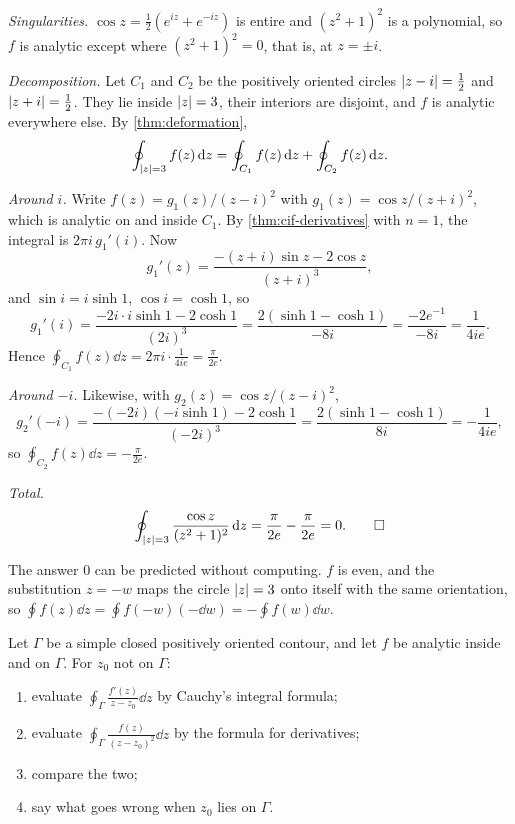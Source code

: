 \begin{solution}
  \emph{Singularities.} $\cos z = \frac12(e^{iz} + e^{-iz})$ is entire and
  $(z^2 + 1)^2$ is a polynomial, so $f$ is analytic except where
  $(z^2 + 1)^2 = 0$, that is, at $z = \pm i$.

  \emph{Decomposition.} Let $C_1$ and $C_2$ be the positively oriented
  circles $\lvert z - i\rvert = \frac12$ and $\lvert z + i\rvert = \frac12$. They lie inside
  $\lvert z\rvert = 3$, their interiors are disjoint, and $f$ is analytic everywhere
  else. By \cref{thm:deformation},
  \[
    \oint_{\lvert z\rvert = 3} f(z) \mathop{}\!\mathrm{d} z
    = \oint_{C_1} f(z) \mathop{}\!\mathrm{d} z + \oint_{C_2} f(z) \mathop{}\!\mathrm{d} z.
  \]

  \emph{Around $i$.} Write $f(z) = g_1(z) / (z - i)^2$ with
  $g_1(z) = \cos z / (z + i)^2$, which is analytic on and inside $C_1$. By
  \cref{thm:cif-derivatives} with $n = 1$, the integral is $2\pi i \, g_1'(i)$.
  Now
  \[
    g_1'(z) = \frac{-(z + i) \sin z - 2\cos z}{(z + i)^3},
  \]
  and $\sin i = i \sinh 1$, $\cos i = \cosh 1$, so
  \[
    g_1'(i)
    = \frac{-2i \cdot i \sinh 1 - 2\cosh 1}{(2i)^3}
    = \frac{2(\sinh 1 - \cosh 1)}{-8i}
    = \frac{-2e^{-1}}{-8i}
    = \frac{1}{4ie}.
  \]
  Hence $\oint_{C_1} f(z) \dd z = 2\pi i \cdot \frac{1}{4ie} = \frac{\pi}{2e}$.

  \emph{Around $-i$.} Likewise, with $g_2(z) = \cos z / (z - i)^2$,
  \[
    g_2'(-i)
    = \frac{-(-2i)(-i \sinh 1) - 2\cosh 1}{(-2i)^3}
    = \frac{2(\sinh 1 - \cosh 1)}{8i}
    = -\frac{1}{4ie},
  \]
  so $\oint_{C_2} f(z) \dd z = -\frac{\pi}{2e}$.

  \emph{Total.}
  \[
    \oint_{\lvert z\rvert = 3} \frac{\cos z}{(z^2 + 1)^2} \mathop{}\!\mathrm{d} z
    = \frac{\pi}{2e} - \frac{\pi}{2e} = 0. \qedhere
  \]
\end{solution}

\begin{remark}
  The answer $0$ can be predicted without computing. $f$ is even, and the
  substitution $z = -w$ maps the circle $\lvert z\rvert = 3$ onto itself with the
  same orientation, so
  $\oint f(z) \dd z = \oint f(-w)(-\dd w) = -\oint f(w) \dd w$.
\end{remark}

\begin{exercise}\label{ex:two-integrals}
  Let $\Gamma$ be a simple closed positively oriented contour, and let $f$ be
  analytic inside and on $\Gamma$. For $z_0$ not on $\Gamma$:
  \begin{enumerate}[label=(\alph*)]
    \item evaluate $\oint_\Gamma \frac{f'(z)}{z - z_0} \dd z$ by Cauchy's
      integral formula;
    \item evaluate $\oint_\Gamma \frac{f(z)}{(z - z_0)^2} \dd z$ by the
      formula for derivatives;
    \item compare the two;
    \item say what goes wrong when $z_0$ lies on $\Gamma$.
  \end{enumerate}
\end{exercise}

